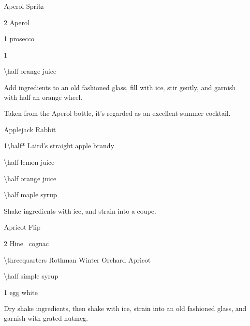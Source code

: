 \begin{PDTCocktail}{Aperol Spritz}
	\begin{Ingredients}
	\item \SI{2}{\oz} Aperol
	\item \SI{1}{\oz} prosecco
	\item \SI{1}{\oz} \soda
	\item \SI{\half}{\oz} orange juice
	\end{Ingredients}
	
	\begin{Instructions}
	Add ingredients to an old fashioned glass, fill with ice, stir gently, and garnish with half an orange wheel.
	
	Taken from the Aperol bottle, it's regarded as an excellent summer cocktail.
	\end{Instructions}
\end{PDTCocktail}

\begin{PDTCocktail}{Applejack Rabbit}
	\begin{Ingredients}
	\item \SI{1\half*}{\oz} Laird's straight apple brandy
	\item \SI{\half}{\oz} lemon juice
	\item \SI{\half}{\oz} orange juice
	\item \SI{\half}{\oz} maple syrup
	\end{Ingredients}
	
	\begin{Instructions}
	Shake ingredients with ice, and strain into a coupe.
	\end{Instructions}
\end{PDTCocktail}

\begin{PDTCocktail}{Apricot Flip}
	\begin{Ingredients}
	\item \SI{2}{\oz} Hine \vsop\ cognac
	\item \SI{\threequarters}{\oz} Rothman \And Winter Orchard Apricot
	\item \SI{\half}{\oz} simple syrup
	\item 1 egg white
	\end{Ingredients}
	
	\begin{Instructions}
	Dry shake ingredients, then shake with ice, strain into an old fashioned glass, and garnish with grated nutmeg.
	\end{Instructions}
\end{PDTCocktail}

